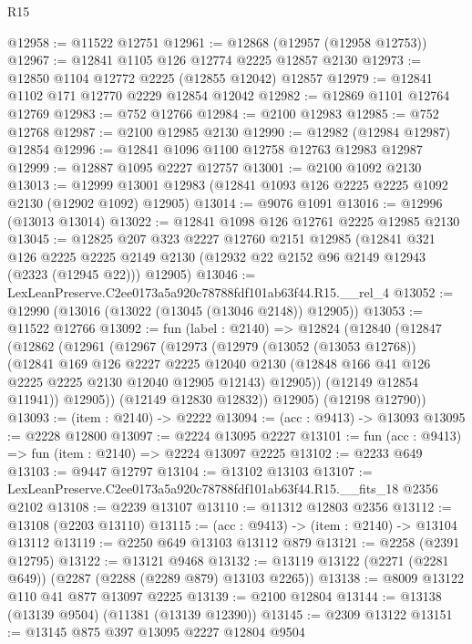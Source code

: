 \begin{lexlean}{R15}
\begin{coremodule}
@12958 := @11522 @12751
@12961 := @12868 (@12957 (@12958 @12753))
@12967 := @12841 @1105 @126 @12774 @2225 @12857 @2130
@12973 := @12850 @1104 @12772 @2225 (@12855 @12042) @12857
@12979 := @12841 @1102 @171 @12770 @2229 @12854 @12042
@12982 := @12869 @1101 @12764 @12769
@12983 := @752 @12766
@12984 := @2100 @12983
@12985 := @752 @12768
@12987 := @2100 @12985 @2130
@12990 := @12982 (@12984 @12987) @12854
@12996 := @12841 @1096 @1100 @12758 @12763 @12983 @12987
@12999 := @12887 @1095 @2227 @12757
@13001 := @2100 @1092 @2130
@13013 := @12999 @13001 @12983 (@12841 @1093 @126 @2225 @2225 @1092 @2130 (@12902 @1092) @12905)
@13014 := @9076 @1091
@13016 := @12996 (@13013 @13014)
@13022 := @12841 @1098 @126 @12761 @2225 @12985 @2130
@13045 := @12825
    @207
    @323
    @2227
    @12760
    @2151
    @12985
    (@12841
      @321
      @126
      @2225
      @2225
      @2149
      @2130
      (@12932 @22 @2152 @96 @2149 @12943 (@2323 (@12945 @22)))
      @12905)
@13046 := LexLeanPreserve.C2ee0173a5a920c78788fdf101ab63f44.R15.__rel_4
@13052 := @12990 (@13016 (@13022 (@13045 (@13046 @2148)) @12905))
@13053 := @11522 @12766
@13092 := fun (label : @2140) =>
  @12824
    (@12840
      (@12847
        (@12862
          (@12961
            (@12967
              (@12973
                (@12979
                  (@13052 (@13053 @12768))
                  (@12841
                    @169
                    @126
                    @2227
                    @2225
                    @12040
                    @2130
                    (@12848 @166 @41 @126 @2225 @2225 @2130 @12040 @12905 @12143)
                    @12905))
                (@12149 @12854 @11941))
              @12905))
          (@12149 @12830 @12832))
        @12905)
      (@12198 @12790))
@13093 := (item : @2140) -> @2222
@13094 := (acc : @9413) -> @13093
@13095 := @2228 @12800
@13097 := @2224 @13095 @2227
@13101 := fun (acc : @9413) => fun (item : @2140) => @2224 @13097 @2225
@13102 := @2233 @649
@13103 := @9447 @12797
@13104 := @13102 @13103
@13107 := LexLeanPreserve.C2ee0173a5a920c78788fdf101ab63f44.R15.__fits_18 @2356 @2102
@13108 := @2239 @13107
@13110 := @11312 @12803 @2356
@13112 := @13108 (@2203 @13110)
@13115 := (acc : @9413) -> (item : @2140) -> @13104 @13112
@13119 := @2250 @649 @13103 @13112 @879
@13121 := @2258 (@2391 @12795)
@13122 := @13121 @9468
@13132 := @13119 @13122 (@2271 (@2281 @649)) (@2287 (@2288 (@2289 @879) @13103 @2265))
@13138 := @8009 @13122 @110 @41 @877 @13097 @2225
@13139 := @2100 @12804
@13144 := @13138 (@13139 @9504) (@11381 (@13139 @12390))
@13145 := @2309 @13122
@13151 := @13145 @875 @397 @13095 @2227 @12804 @9504

\end{coremodule}
\end{lexlean}
